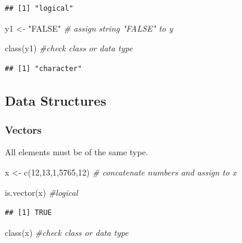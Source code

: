 \documentclass[
]{article}
\newenvironment{Shaded}{\begin{snugshade}}{\end{snugshade}}
\newcommand{\CommentTok}[1]{\textcolor[rgb]{0.56,0.35,0.01}{\textit{#1}}}
\newcommand{\DecValTok}[1]{\textcolor[rgb]{0.00,0.00,0.81}{#1}}
\newcommand{\FunctionTok}[1]{\textcolor[rgb]{0.00,0.00,0.00}{#1}}
\newcommand{\NormalTok}[1]{#1}
\newcommand{\OtherTok}[1]{\textcolor[rgb]{0.56,0.35,0.01}{#1}}
\newcommand{\StringTok}[1]{\textcolor[rgb]{0.31,0.60,0.02}{#1}}
\begin{document}
\begin{verbatim}
## [1] "logical"
\end{verbatim}

\begin{Shaded}
\begin{Highlighting}[]
\NormalTok{y1 }\OtherTok{\textless{}{-}} \StringTok{"FALSE"} \CommentTok{\# assign string "FALSE" to y}

\FunctionTok{class}\NormalTok{(y1) }\CommentTok{\#check class or data type}
\end{Highlighting}
\end{Shaded}

\begin{verbatim}
## [1] "character"
\end{verbatim}

\hypertarget{data-structures}{%
\subsection{Data Structures}\label{data-structures}}

\hypertarget{vectors}{%
\subsubsection{Vectors}\label{vectors}}

All elements must be of the same type.

\begin{Shaded}
\begin{Highlighting}[]
\NormalTok{x }\OtherTok{\textless{}{-}} \FunctionTok{c}\NormalTok{(}\DecValTok{12}\NormalTok{,}\DecValTok{13}\NormalTok{,}\DecValTok{1}\NormalTok{,}\DecValTok{5765}\NormalTok{,}\DecValTok{12}\NormalTok{) }\CommentTok{\# concatenate numbers and assign to x}

\FunctionTok{is.vector}\NormalTok{(x) }\CommentTok{\#logical}
\end{Highlighting}
\end{Shaded}

\begin{verbatim}
## [1] TRUE
\end{verbatim}

\begin{Shaded}
\begin{Highlighting}[]
\FunctionTok{class}\NormalTok{(x) }\CommentTok{\#check class or data type}
\end{Highlighting}
\end{Shaded}
\end{document}
